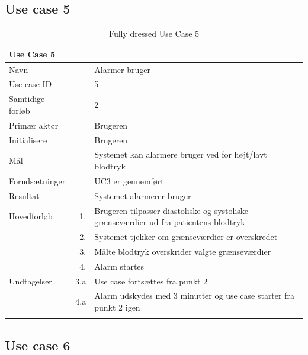 \subsection{Use case 5}

\begin{longtabu} to  %
    {\large \textbf{Use Case 5}} && \\
    \toprule
    Navn &&    Alarmer bruger\\
    Use case ID &&    5\\
    Samtidige forløb &&    2\\
    Primær aktør &&    Brugeren\\
    Initialisere &&   Brugeren\\
    Mål && Systemet kan alarmere bruger ved for højt/lavt blodtryk\\
    Forudsætninger && UC3 er gennemført\\
    Resultat &&    Systemet alarmerer bruger                    \\ \midrule
    Hovedforløb &    1. &    Brugeren tilpasser diastoliske og systoliske grænseværdier ud fra patientens blodtryk\\ 
    			& 	 2. & 	Systemet tjekker om grænseværdier er overskredet\\ 
    			&	 3. & 	Målte blodtryk overskrider valgte grænseværdier\\ 
    			& 	 4. & 	Alarm startes \\ \midrule            
    Undtagelser &    3.a & Use case fortsættes fra punkt 2 \\ 
    			&	 4.a & Alarm udskydes med 3 minutter og use case starter fra punkt 2 igen\\ \bottomrule
\caption{Fully dressed Use Case 5}
\label{UC5}
\end{longtabu}

\subsection{Use case 6}

